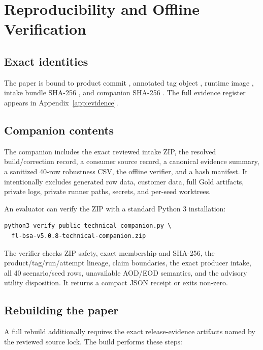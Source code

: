 \section{Reproducibility and Offline Verification}

\subsection{Exact identities}

The paper is bound to product commit \IdentityText{\ProductCommitRaw}, annotated tag object
\IdentityText{\ProductTagObjectRaw}, runtime image \IdentityText{\RuntimeImageDigestRaw}, intake
bundle SHA-256 \IdentityText{\IntakeBundleShaRaw}, and companion SHA-256
\IdentityText{\CompanionShaRaw}. The full evidence register appears in Appendix~\ref{app:evidence}.

\subsection{Companion contents}

The companion includes the exact reviewed intake ZIP, the resolved build/correction record, a
consumer source record, a canonical evidence summary, a sanitized 40-row robustness CSV, the
offline verifier, and a hash manifest. It intentionally excludes generated row data, customer data,
full Gold artifacts, private logs, private runner paths, secrets, and per-seed worktrees.

An evaluator can verify the ZIP with a standard Python 3 installation:

\begin{verbatim}
python3 verify_public_technical_companion.py \
  fl-bsa-v5.0.8-technical-companion.zip
\end{verbatim}

The verifier checks ZIP safety, exact membership and SHA-256, the product/tag/run/attempt lineage,
claim boundaries, the exact producer intake, all 40 scenario/seed rows, unavailable AOD/EOD
semantics, and the advisory utility disposition. It returns a compact JSON receipt or exits
non-zero.

\subsection{Rebuilding the paper}

A full rebuild additionally requires the exact release-evidence artifacts named by the reviewed
source lock. The build performs these steps:

